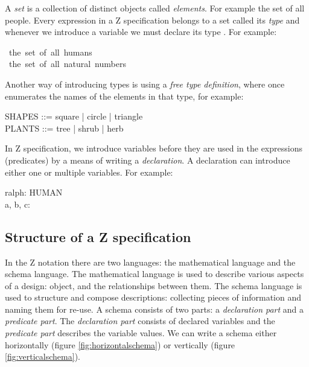 A \textit{set} is a collection of distinct objects called \textit{elements}. For example the set of all people. Every expression in a Z specification belongs to a set called its \textit{type} and whenever we introduce a variable we must declare its type \cite{essenceofz}. For example:

\begin{zed}
[HUMAN]\ the\ set\ of\ all\ humans \\
\nat\ the\ set\ of\ all\ natural\ numbers
\end{zed}

Another way of introducing types is using a \textit{free type definition}, where once enumerates the names of the elements in that type, for example:

\begin{zed}
SHAPES ::= square | circle | triangle \\
PLANTS ::= tree | shrub | herb \\
\end{zed}

In Z specification, we introduce variables before they are used in the expressions (predicates) by a means of writing a \textit{declaration}. A declaration can introduce either one or multiple variables. For example:

\begin{zed}
ralph: HUMAN \\
a, b, c: \nat
\end{zed}

\subsection{Structure of a Z specification}

In the Z notation there are two languages: the mathematical language and the schema language. The mathematical language is used to describe various aspects of a design: object, and the relationships between them. The schema language is used to structure and compose descriptions: collecting pieces of information and naming them for re-use. A schema consists of two parts: a \emph{declaration part} and a \emph{predicate part}. The \emph{declaration part} consists of declared variables and the \emph{predicate part} describes the variable values. We can write a schema either horizontally (figure \ref{fig:horizontalschema}) or vertically (figure \ref{fig:verticalschema}).

